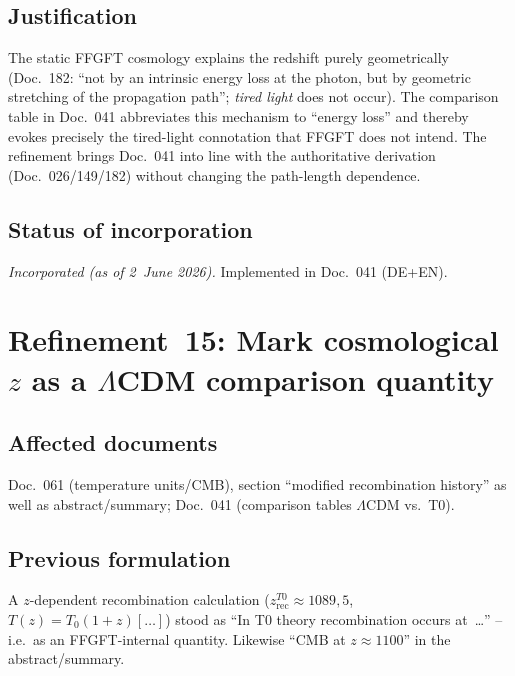 \subsection*{Justification}

The static FFGFT cosmology explains the redshift purely geometrically
(Doc.~182: \enquote{not by an intrinsic energy loss at the photon, but by
geometric stretching of the propagation path}; \emph{tired light} does not
occur). The comparison table in Doc.~041 abbreviates this mechanism to
\enquote{energy loss} and thereby evokes precisely the tired-light connotation
that FFGFT does not intend. The refinement brings Doc.~041 into line with the
authoritative derivation (Doc.~026/149/182) without changing the path-length
dependence.

\subsection*{Status of incorporation}

\emph{Incorporated (as of 2~June 2026).} Implemented in Doc.~041 (DE+EN).

\section{\texorpdfstring{Refinement~15: Mark cosmological $z$ as a $\Lambda$CDM comparison quantity}{Refinement 15: Mark cosmological z as a LambdaCDM comparison quantity}}

\subsection*{Affected documents}

Doc.~061 (temperature units/CMB), section \enquote{modified recombination
history} as well as abstract/summary; Doc.~041 (comparison tables $\Lambda$CDM
vs.\ T0).

\subsection*{Previous formulation}

A $z$-dependent recombination calculation ($z_{\text{rec}}^{T0}\approx 1089{,}5$,
$T(z)=T_0(1+z)[\dots]$) stood as \enquote{In T0 theory recombination occurs
at~\dots} -- i.e.\ as an FFGFT-internal quantity. Likewise \enquote{CMB at
$z\approx 1100$} in the abstract/summary.

